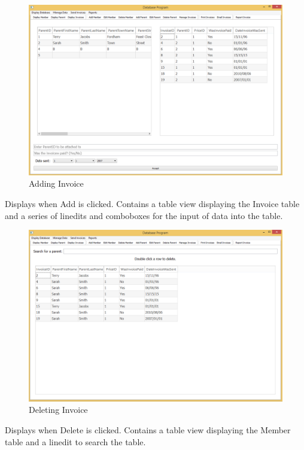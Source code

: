 \begin{figure}[H]
\includegraphics[width=\textwidth]{./Maintenance/Images/AddInvoice.png}
    \caption{Adding Invoice} \label{fig:add_invoice}
\end{figure}

Displays when Add is clicked. Contains a table view displaying the Invoice table and a series of linedits and comboboxes for the input of data into the table.

\begin{figure}[H]
\includegraphics[width=\textwidth]{./Maintenance/Images/DeleteInvoice.png}
    \caption{Deleting Invoice} \label{fig:delete_invoice}
\end{figure}

Displays when Delete is clicked. Contains a table view displaying the Member table and a linedit to search the table.


